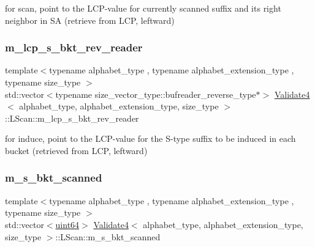 for scan, point to the L\+C\+P-\/value for currently scanned suffix and its right neighbor in SA (retrieve from L\+CP, leftward) 

\mbox{\label{struct_validate4_1_1_l_scan_a469303775a2ce2e5199df1cad4ba121b}} 
\subsubsection{\texorpdfstring{m\+\_\+lcp\+\_\+s\+\_\+bkt\+\_\+rev\+\_\+reader}{m\_lcp\_s\_bkt\_rev\_reader}}
{\footnotesize\ttfamily template$<$typename alphabet\+\_\+type , typename alphabet\+\_\+extension\+\_\+type , typename size\+\_\+type $>$ \\
std\+::vector$<$typename size\+\_\+vector\+\_\+type\+::bufreader\+\_\+reverse\+\_\+type$\ast$$>$ \hyperlink{class_validate4}{Validate4}$<$ alphabet\+\_\+type, alphabet\+\_\+extension\+\_\+type, size\+\_\+type $>$\+::L\+Scan\+::m\+\_\+lcp\+\_\+s\+\_\+bkt\+\_\+rev\+\_\+reader\hspace{0.3cm}{\ttfamily [private]}}



for induce, point to the L\+C\+P-\/value for the S-\/type suffix to be induced in each bucket (retrieved from L\+CP, leftward) 

\mbox{\label{struct_validate4_1_1_l_scan_a66ce5f59bcd37d47371f847769297b46}} 
\subsubsection{\texorpdfstring{m\+\_\+s\+\_\+bkt\+\_\+scanned}{m\_s\_bkt\_scanned}}
{\footnotesize\ttfamily template$<$typename alphabet\+\_\+type , typename alphabet\+\_\+extension\+\_\+type , typename size\+\_\+type $>$ \\
std\+::vector$<$\hyperlink{types_8h_a60e8696a4678cd348e991a1f172e53f7}{uint64}$>$ \hyperlink{class_validate4}{Validate4}$<$ alphabet\+\_\+type, alphabet\+\_\+extension\+\_\+type, size\+\_\+type $>$\+::L\+Scan\+::m\+\_\+s\+\_\+bkt\+\_\+scanned\hspace{0.3cm}{\ttfamily [private]}}




